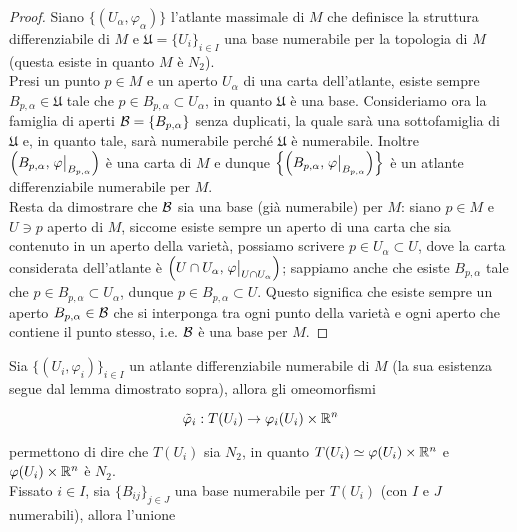 \begin{proof}
	Siano $ \{(U_{\alpha},\varphi_{\alpha})\} $ l'atlante massimale di $ M $ che definisce la struttura differenziabile di $ M $ e $ \mathfrak{U} = \{U_{i}\}_{i \in I} $ una base numerabile per la topologia di $ M $ (questa esiste in quanto $ M $ è $ N_{2} $). \\
	Presi un punto $ p \in M $ e un aperto $ U_{\alpha} $ di una carta dell'atlante, esiste sempre $ B_{p,\alpha} \in \mathfrak{U} $ tale che $ p \in B_{p,\alpha} \subset U_{\alpha} $, in quanto $ \mathfrak{U} $ è una base. Consideriamo ora la famiglia di aperti $ \mathcal{B} = \{B_{p,\alpha}\} $ senza duplicati, la quale sarà una sottofamiglia di $ \mathfrak{U} $ e, in quanto tale, sarà numerabile perché $ \mathfrak{U} $ è numerabile. Inoltre $ \left( B_{p,\alpha}, \eval{\varphi}_{B_{p,\alpha}} \right) $ è una carta di $ M $ e dunque $ \left\{ \left( B_{p,\alpha}, \eval{\varphi}_{B_{p,\alpha}} \right) \right\} $ è un atlante differenziabile numerabile per $ M $. \\
	Resta da dimostrare che $ \mathcal{B} $ sia una base (già numerabile) per $ M $: siano $ p \in M $ e $ U \ni p $ aperto di $ M $, siccome esiste sempre un aperto di una carta che sia contenuto in un aperto della varietà, possiamo scrivere $ p \in U_{\alpha} \subset U $, dove la carta considerata dell'atlante è $ \left( U \cap U_{\alpha}, \eval{\varphi}_{U \cap U_{\alpha}} \right) $; sappiamo anche che esiste $ B_{p,\alpha} $ tale che $ p \in B_{p,\alpha} \subset U_{\alpha} $, dunque $ p \in B_{p,\alpha} \subset U $. Questo significa che esiste sempre un aperto $ B_{p,\alpha} \in \mathcal{B} $ che si interponga tra ogni punto della varietà e ogni aperto che contiene il punto stesso, i.e. $ \mathcal{B} $ è una base per $ M $.
\end{proof}

Sia $ \{(U_{i},\varphi_{i})\}_{i \in I} $ un atlante differenziabile numerabile di $ M $ (la sua esistenza segue dal lemma dimostrato sopra), allora gli omeomorfismi

\begin{equation}
	\tilde{\varphi}_{i} : T(U_{i}) \to \varphi_{i}(U_{i}) \times \mathbb{R}^{n}
\end{equation}

permettono di dire che $ T(U_{i}) $ sia $ N_{2} $, in quanto $ T(U_{i}) \simeq \varphi(U_{i}) \times \mathbb{R}^{n} $ e $ \varphi(U_{i}) \times \mathbb{R}^{n} $ è $ N_{2} $. \\
Fissato $ i \in I $, sia $ \{B_{ij}\}_{j \in J} $ una base numerabile per $ T(U_{i}) $ (con $ I $ e $ J $ numerabili), allora l'unione

